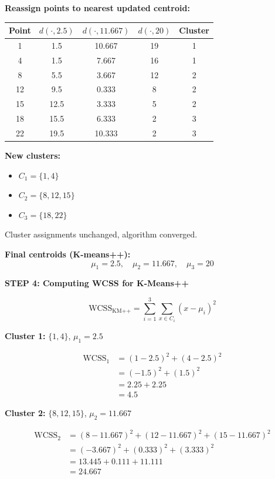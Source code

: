\documentclass[12pt]{article}
\begin{document}
\begin{solution}
\textbf{Reassign points to nearest updated centroid:}

\begin{center}
\begin{tabular}{c|c|c|c|c}
Point & $d(\cdot, 2.5)$ & $d(\cdot, 11.667)$ & $d(\cdot, 20)$ & Cluster \\
\hline
1 & 1.5 & 10.667 & 19 & 1 \\
4 & 1.5 & 7.667 & 16 & 1 \\
8 & 5.5 & 3.667 & 12 & 2 \\
12 & 9.5 & 0.333 & 8 & 2 \\
15 & 12.5 & 3.333 & 5 & 2 \\
18 & 15.5 & 6.333 & 2 & 3 \\
22 & 19.5 & 10.333 & 2 & 3 \\
\end{tabular}
\end{center}

\textbf{New clusters:}
\begin{itemize}
    \item $C_1 = \{1, 4\}$
    \item $C_2 = \{8, 12, 15\}$
    \item $C_3 = \{18, 22\}$
\end{itemize}

Cluster assignments unchanged, algorithm converged.

\textbf{Final centroids (K-means++):}
\[
\boxed{\mu_1 = 2.5, \quad \mu_2 = 11.667, \quad \mu_3 = 20}
\]

\textbf{STEP 4: Computing WCSS for K-Means++}

\[
\text{WCSS}_{\text{KM++}} = \sum_{i=1}^3 \sum_{x \in C_i} (x - \mu_i)^2
\]

\textbf{Cluster 1:} $\{1, 4\}$, $\mu_1 = 2.5$

\begin{align*}
\text{WCSS}_1 &= (1 - 2.5)^2 + (4 - 2.5)^2 \\
&= (-1.5)^2 + (1.5)^2 \\
&= 2.25 + 2.25 \\
&= 4.5
\end{align*}

\textbf{Cluster 2:} $\{8, 12, 15\}$, $\mu_2 = 11.667$

\begin{align*}
\text{WCSS}_2 &= (8 - 11.667)^2 + (12 - 11.667)^2 + (15 - 11.667)^2 \\
&= (-3.667)^2 + (0.333)^2 + (3.333)^2 \\
&= 13.445 + 0.111 + 11.111 \\
&= 24.667
\end{align*}


\end{solution}
\end{document}
